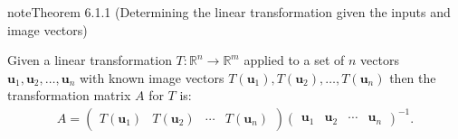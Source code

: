 \documentclass[letterpaper,10pt,english]{jupyterBook}
\begin{document}
\begin{sphinxadmonition}{note}{Theorem 6.1.1 (Determining the linear transformation given the inputs and image vectors)}



\sphinxAtStartPar
Given a linear transformation \(T: \mathbb{R}^n \to \mathbb{R}^m\) applied to a set of \(n\) vectors \(\mathbf{u}_1, \mathbf{u}_2, \ldots, \mathbf{u}_n\) with known image vectors \(T(\mathbf{u}_1), T(\mathbf{u}_2), \ldots, T(\mathbf{u}_n)\) then the transformation matrix \(A\) for \(T\) is:
\begin{equation}\label{equation:_pages/6.1_Transformation_matrices:determining-the-transformation-matrix}
\begin{split} A = \begin{pmatrix} T(\mathbf{u}_1) & T(\mathbf{u}_2) & \cdots & T(\mathbf{u}_n) \end{pmatrix}  
\begin{pmatrix} \mathbf{u}_1 & \mathbf{u}_2 & \cdots & \mathbf{u}_n \end{pmatrix}^{-1}. \end{split}
\end{equation}\end{sphinxadmonition}
\label{_pages/6.1_Transformation_matrices:transformation-matrix-example-2}
\end{document}
